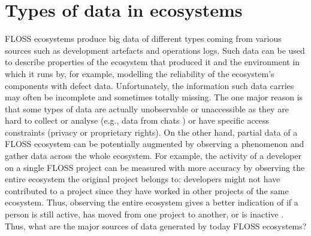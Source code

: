 \chapter{Types of data in ecosystems}

FLOSS ecosystems produce big data of different types coming from various 
sources such as development artefacts and operations logs. 
Such data can be used to describe properties of the ecosystem that produced 
it and the environment in which it runs by, for example, modelling the reliability 
of the ecosystem's components with defect data. Unfortunately, the information 
such data carries may often be incomplete and sometimes totally missing. 
The one major reason is that some types of data are actually unobservable 
or unaccessible as they are hard to collect or analyse (e.g., data from chats \cite{ZouSong2016}) or 
have specific access constraints (privacy or proprietary rights). On the other hand,  
partial data of a FLOSS ecosystem can be potentially augmented by observing 
a phenomenon and gather data  across the whole ecosystem. For example, 
the activity of a developer on a single FLOSS project can be measured 
with more accuracy by observing the entire ecosystem  the original project 
belongs to: developers might not have contributed  to a project since they have 
worked  in other projects of the same ecosystem. 
Thus, observing the entire ecosystem gives a better indication of if a person 
is still active, has moved from one project to another, or is  inactive \cite{BogdanXXX}. 
Thus, what are the major sources of data generated by today FLOSS ecosystems?

